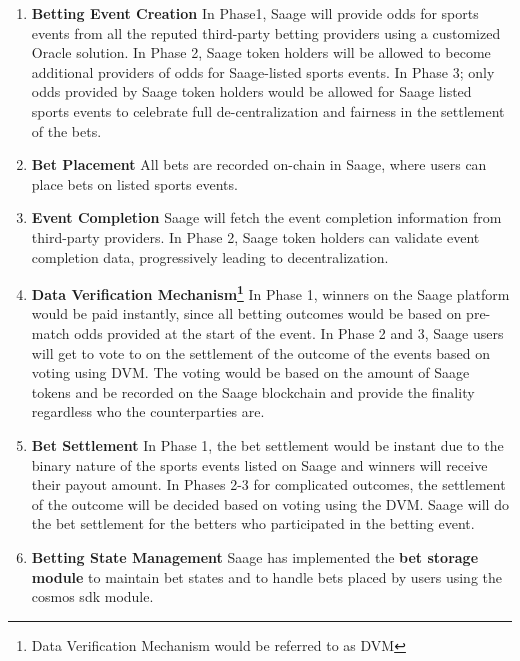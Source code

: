 \documentclass[%
 aapm,
 mph,%
 amsmath,amssymb,
 reprint,%
]{revtex4-2}
\begin{document}
\begin{enumerate}

\item \textbf{Betting Event Creation} In Phase1, Saage will provide odds for sports events from all the reputed third-party betting providers using a customized Oracle solution. In Phase 2, Saage token holders will be allowed to become additional providers of odds for Saage-listed sports events. In Phase 3; only odds provided by Saage token holders would be allowed for Saage listed sports events to celebrate full de-centralization and fairness in the settlement of the bets. 

\item \textbf{Bet Placement} All bets are recorded on-chain in Saage, where users can place bets on listed sports events.

\item \textbf{Event Completion} Saage will fetch the event completion information from third-party providers. In Phase 2, Saage token holders can validate event completion data, progressively leading to decentralization.

\item \textbf{Data Verification Mechanism\footnote{Data Verification Mechanism would be referred to as DVM}} In Phase 1, winners on the Saage platform would be paid instantly, since all betting outcomes would be based on pre-match odds provided at the start of the event. In Phase 2 and 3, Saage users will get to vote to on the settlement of the outcome of the events based on voting using DVM. The voting would be based on the amount of Saage tokens and be recorded on the Saage blockchain and provide the finality regardless who the counterparties are.

\item \textbf{Bet Settlement} In Phase 1, the bet settlement would be instant due to the binary nature of the sports events listed on Saage and winners will receive their payout amount. In Phases 2-3 for complicated outcomes, the settlement of the outcome will be decided based on voting using the DVM. Saage will do the bet settlement for the betters who participated in the betting event. 

\item \textbf{Betting State Management} Saage has implemented the \textbf{bet storage module} to maintain bet states and to handle bets placed by users using the cosmos sdk module. 

\end{enumerate}
\end{document}
